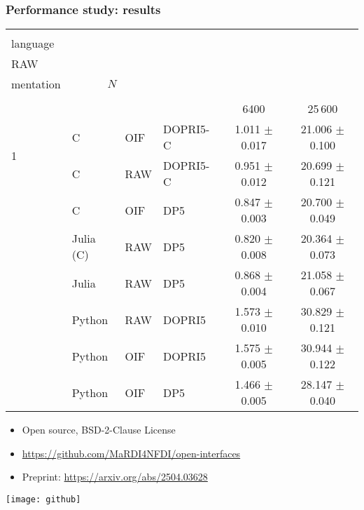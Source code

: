 \documentclass[
  10pt,
  aspectratio=169,
  english,
]{beamer}
\begin{document}
\begin{frame}
  \frametitle{Performance study: results}

\newcommand{\myheader}{%
\headerWithBreaks{0.2em}{\#} &
\headerWithBreaks{3em}{User\\language} &
\headerWithBreaks{1.5em}{OIF/\\RAW} &
\headerWithBreaks{3em}{Imple-\\mentation} &
                                \multicolumn{2}{c}{$N$} \\
                                \cmidrule(lr){5-6}
}
  \vspace{1em}
  \centering
  \begin{tabular}{l l l l c c}
    \toprule
    \myheader                                                                                    \\
                       &           &     &          & 6400                & 25\,600              \\
    \midrule
    \multirow{2}{*}{1} & C         & OIF & DOPRI5-C & 1.011 \(\pm\) 0.017 & 21.006 \(\pm\) 0.100 \\
                       & C         & RAW & DOPRI5-C & 0.951 \(\pm\) 0.012 & 20.699 \(\pm\) 0.121 \\
    \addlinespace
    \addlinespace
    \multirow{3}{*}{2} & C         & OIF & DP5      & 0.847 \(\pm\) 0.003 & 20.700 \(\pm\) 0.049 \\
                       & Julia (C) & RAW & DP5      & 0.820 \(\pm\) 0.008 & 20.364 \(\pm\) 0.073 \\
                       & Julia     & RAW & DP5      & 0.868 \(\pm\) 0.004 & 21.058 \(\pm\) 0.067 \\
    \addlinespace
    \addlinespace
    \multirow{3}{*}{3} & Python    & RAW & DOPRI5   & 1.573 \(\pm\) 0.010 & 30.829 \(\pm\) 0.121 \\
                       & Python    & OIF & DOPRI5   & 1.575 \(\pm\) 0.005 & 30.944 \(\pm\) 0.122 \\
                       & Python    & OIF & DP5      & 1.466 \(\pm\) 0.005 & 28.147 \(\pm\) 0.040 \\
    \bottomrule
  \end{tabular}
\end{frame}

% 

\begin{frame}
  \begin{minipage}{0.618\textwidth}
    \begin{itemize}
      \item Open source, BSD-2-Clause License
      \item \url{https://github.com/MaRDI4NFDI/open-interfaces}
      \item Preprint: \url{https://arxiv.org/abs/2504.03628}
    \end{itemize}
  \end{minipage}%
  \begin{minipage}{0.382\textwidth}
    \texttt{[image: github]}
  \end{minipage}
\end{frame}
\end{document}
